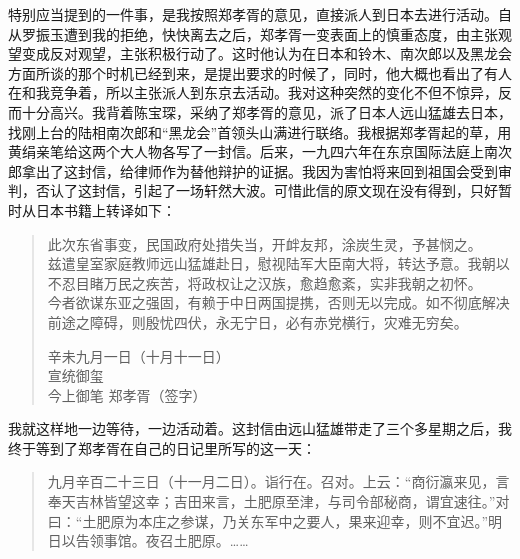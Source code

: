 特别应当提到的一件事，是我按照郑孝胥的意见，直接派人到日本去进行活动。自从罗振玉遭到我的拒绝，快快离去之后，郑孝胥一变表面上的慎重态度，由主张观望变成反对观望，主张积极行动了。这时他认为在日本和铃木、南次郎以及黑龙会方面所谈的那个时机已经到来，是提出要求的时候了，同时，他大概也看出了有人在和我竞争着，所以主张派人到东京去活动。我对这种突然的变化不但不惊异，反而十分高兴。我背着陈宝琛，采纳了郑孝胥的意见，派了日本人远山猛雄去日本，找刚上台的陆相南次郎和“黑龙会”首领头山满进行联络。我根据郑孝胥起的草，用黄绢亲笔给这两个大人物各写了一封信。后来，一九四六年在东京国际法庭上南次郎拿出了这封信，给律师作为替他辩护的证据。我因为害怕将来回到祖国会受到审判，否认了这封信，引起了一场轩然大波。可惜此信的原文现在没有得到，只好暂时从日本书籍上转译如下：\\

\begin{quote}
	此次东省事变，民国政府处措失当，开衅友邦，涂炭生灵，予甚悯之。\\

兹遣皇室家庭教师远山猛雄赴日，慰视陆军大臣南大将，转达予意。我朝以不忍目睹万民之疾苦，将政权让之汉族，愈趋愈紊，实非我朝之初怀。\\

今者欲谋东亚之强固，有赖于中日两国提携，否则无以完成。如不彻底解决前途之障碍，则殷忧四伏，永无宁日，必有赤党横行，灾难无穷矣。\\

\begin{flushright}
	辛未九月一日（十月十一日）\\

宣统御玺\\

今上御笔       郑孝胥（签字）\\
\end{flushright}
\end{quote}

我就这样地一边等待，一边活动着。这封信由远山猛雄带走了三个多星期之后，我终于等到了郑孝胥在自己的日记里所写的这一天：\\

\begin{quote}
	九月辛百二十三日（十一月二日）。诣行在。召对。上云：“商衍瀛来见，言奉天吉林皆望这幸；吉田来言，土肥原至津，与司令部秘商，谓宜速往。”对曰：“土肥原为本庄之参谋，乃关东军中之要人，果来迎幸，则不宜迟。”明日以告领事馆。夜召土肥原。……\\
\end{quote}